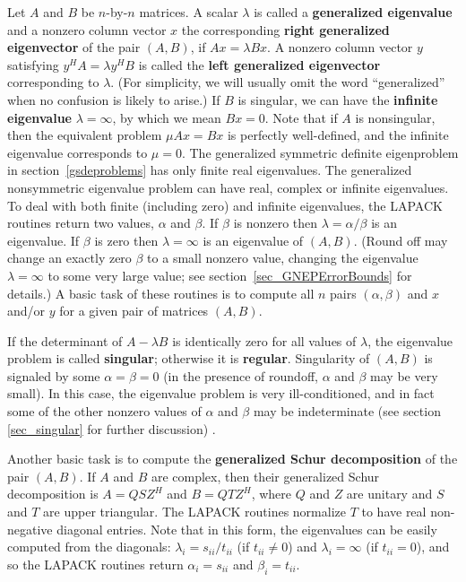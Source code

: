 Let $A$ and $B$ be $n$-by-$n$ matrices.
A scalar $\lambda$ is called
a {\bf generalized eigenvalue} 
and a nonzero column vector $x$ the
corresponding {\bf right generalized eigenvector}
 of the pair $(A,B)$,
if $Ax = \lambda Bx$.
A nonzero column vector $y$ satisfying $y^H A = \lambda y^H B$ is called the
{\bf left generalized eigenvector} 
corresponding to $\lambda$. (For
simplicity, we will usually omit the word ``generalized'' when no
confusion is likely to arise.)  If $B$ is singular, we can have the
{\bf infinite eigenvalue} 
$\lambda = \infty$, by which we mean
$Bx = 0$.  Note that if $A$ is nonsingular, then the equivalent
problem $\mu Ax = Bx$ is perfectly well-defined, and the infinite
eigenvalue corresponds to $\mu = 0$.
The generalized symmetric definite eigenproblem in section~\ref{gsdeproblems}
has only finite real eigenvalues. The generalized nonsymmetric
eigenvalue problem can have real, complex or infinite eigenvalues.
To deal with both finite (including zero) and infinite
eigenvalues, the LAPACK routines return two values, $\alpha$ and $\beta$.
If $\beta$ is nonzero then $\lambda = \alpha/\beta$ is an eigenvalue.
If $\beta$ is zero then
$\lambda = \infty$ is an eigenvalue of $(A, B)$.
(Round off may change an exactly zero $\beta$ to a small nonzero value,
changing the eigenvalue $\lambda = \infty$ to some very large value;
see section~\ref{sec_GNEPErrorBounds} for details.)
A basic task of these
routines is to compute all $n$ pairs $(\alpha,\beta)$ and $x$ and/or
$y$ for a given pair of matrices $(A,B)$.

If the determinant of $A - \lambda B$ is identically
zero for all values of $\lambda$,
the eigenvalue problem is called {\bf singular}; otherwise it is {\bf regular}.
Singularity of $(A,B)$ is signaled by some
$\alpha = \beta = 0$ (in the presence of roundoff, $\alpha$ and $\beta$
may be very small).  In this case, the eigenvalue problem is very
ill-conditioned, and in fact some of the other nonzero values of $\alpha$
and $\beta$ may be indeterminate (see section \ref{sec_singular} for further
discussion)
\cite{stewart72,wilkinson79,demmelkagstrom87,gantmacher}.

Another basic task is to compute the {\bf generalized Schur decomposition}
of the pair $(A,B)$.  If $A$ and $B$ are complex, then their generalized
Schur decomposition is $A = QSZ^H$ and $B = QTZ^H$, where $Q$ and $Z$ are
unitary and $S$ and $T$ are upper triangular.  The LAPACK routines
normalize $T$ to have real non-negative diagonal entries. 
Note that in this
form, the eigenvalues can be easily computed from the diagonals:
$\lambda_i = s_{ii}/t_{ii}$ (if $t_{ii} \neq 0$) and
$\lambda_i = \infty$ (if $t_{ii} = 0$), and so the LAPACK
routines return  $\alpha_i = s_{ii}$ and $\beta_i = t_{ii}$.

